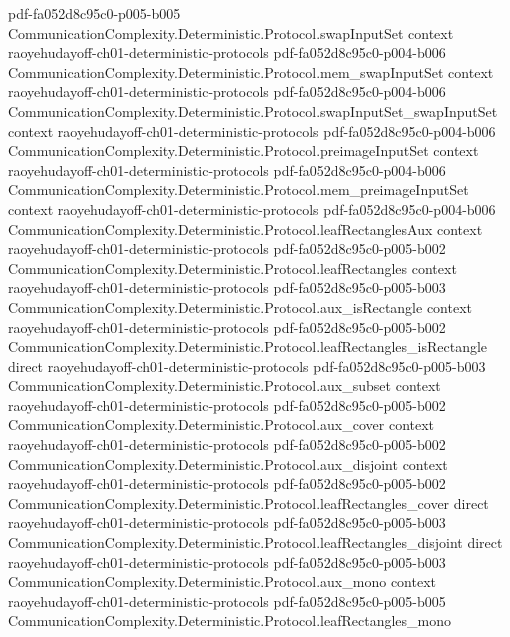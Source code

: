 \begin{theorem}
  {pdf-fa052d8c95c0-p005-b005}
\proofstep
  {CommunicationComplexity.Deterministic.Protocol.swapInputSet}
  {context}
  {raoyehudayoff-ch01-deterministic-protocols}
  {pdf-fa052d8c95c0-p004-b006}
\proofstep
  {CommunicationComplexity.Deterministic.Protocol.mem_swapInputSet}
  {context}
  {raoyehudayoff-ch01-deterministic-protocols}
  {pdf-fa052d8c95c0-p004-b006}
\proofstep
  {CommunicationComplexity.Deterministic.Protocol.swapInputSet_swapInputSet}
  {context}
  {raoyehudayoff-ch01-deterministic-protocols}
  {pdf-fa052d8c95c0-p004-b006}
\proofstep
  {CommunicationComplexity.Deterministic.Protocol.preimageInputSet}
  {context}
  {raoyehudayoff-ch01-deterministic-protocols}
  {pdf-fa052d8c95c0-p004-b006}
\proofstep
  {CommunicationComplexity.Deterministic.Protocol.mem_preimageInputSet}
  {context}
  {raoyehudayoff-ch01-deterministic-protocols}
  {pdf-fa052d8c95c0-p004-b006}
\proofstep
  {CommunicationComplexity.Deterministic.Protocol.leafRectanglesAux}
  {context}
  {raoyehudayoff-ch01-deterministic-protocols}
  {pdf-fa052d8c95c0-p005-b002}
\proofstep
  {CommunicationComplexity.Deterministic.Protocol.leafRectangles}
  {context}
  {raoyehudayoff-ch01-deterministic-protocols}
  {pdf-fa052d8c95c0-p005-b003}
\proofstep
  {CommunicationComplexity.Deterministic.Protocol.aux_isRectangle}
  {context}
  {raoyehudayoff-ch01-deterministic-protocols}
  {pdf-fa052d8c95c0-p005-b002}
\proofstep
  {CommunicationComplexity.Deterministic.Protocol.leafRectangles_isRectangle}
  {direct}
  {raoyehudayoff-ch01-deterministic-protocols}
  {pdf-fa052d8c95c0-p005-b003}
\proofstep
  {CommunicationComplexity.Deterministic.Protocol.aux_subset}
  {context}
  {raoyehudayoff-ch01-deterministic-protocols}
  {pdf-fa052d8c95c0-p005-b002}
\proofstep
  {CommunicationComplexity.Deterministic.Protocol.aux_cover}
  {context}
  {raoyehudayoff-ch01-deterministic-protocols}
  {pdf-fa052d8c95c0-p005-b002}
\proofstep
  {CommunicationComplexity.Deterministic.Protocol.aux_disjoint}
  {context}
  {raoyehudayoff-ch01-deterministic-protocols}
  {pdf-fa052d8c95c0-p005-b002}
\proofstep
  {CommunicationComplexity.Deterministic.Protocol.leafRectangles_cover}
  {direct}
  {raoyehudayoff-ch01-deterministic-protocols}
  {pdf-fa052d8c95c0-p005-b003}
\proofstep
  {CommunicationComplexity.Deterministic.Protocol.leafRectangles_disjoint}
  {direct}
  {raoyehudayoff-ch01-deterministic-protocols}
  {pdf-fa052d8c95c0-p005-b003}
\proofstep
  {CommunicationComplexity.Deterministic.Protocol.aux_mono}
  {context}
  {raoyehudayoff-ch01-deterministic-protocols}
  {pdf-fa052d8c95c0-p005-b005}
\proofstep
  {CommunicationComplexity.Deterministic.Protocol.leafRectangles_mono}

\end{theorem}
